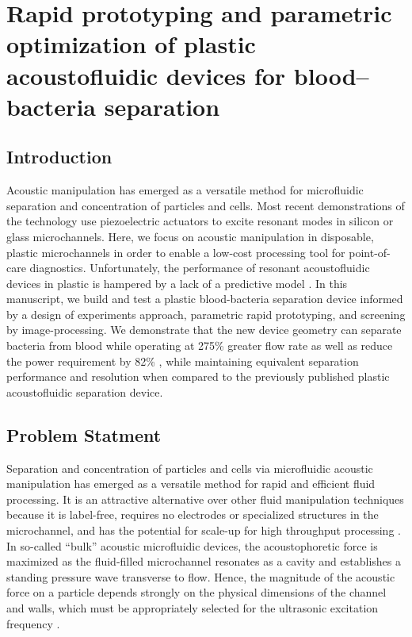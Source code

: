 \chapter{Rapid prototyping and parametric optimization of plastic acoustofluidic devices for blood--bacteria separation}
\label{chapter:acoust}
\thispagestyle{myheadings}

\graphicspath{{4_acoust/Figures/}}

\section{Introduction}
\label{sec:acoust_intro}
Acoustic manipulation has emerged as a versatile method for microfluidic separation and concentration of particles and cells. Most recent demonstrations of the technology use piezoelectric actuators to excite resonant modes in silicon or glass microchannels. Here, we focus on acoustic manipulation in disposable, plastic microchannels in order to enable a low-cost processing tool for point-of-care diagnostics. Unfortunately, the performance of resonant acoustofluidic devices in plastic is hampered by a lack of a predictive model . In this manuscript, we build and test a plastic blood-bacteria separation device informed by a design of experiments approach, parametric rapid prototyping, and screening by image-processing. We demonstrate that the new device geometry can separate bacteria from blood while operating at 275\% greater flow rate as well as reduce the power requirement by 82\% , while maintaining equivalent separation performance and resolution when compared to the previously published plastic acoustofluidic separation device. 

\section{Problem Statment}
\label{sec:acoust_ps}
Separation and concentration of particles and cells via microfluidic acoustic manipulation has emerged as a versatile method for rapid and efficient fluid processing. It is an attractive alternative over other fluid manipulation techniques because it is label-free, requires no electrodes or specialized structures in the microchannel, and has the potential for scale-up for high throughput processing \cite{antfolk2017continuous}\cite{bhagat2010microfluidics}. In so-called ``bulk'' acoustic microfluidic devices, the acoustophoretic force is maximized  as the fluid-filled microchannel resonates as a cavity and establishes a standing pressure wave transverse to flow.  Hence, the magnitude of the acoustic force on a particle depends strongly on the physical dimensions of the channel and walls, which must be appropriately selected for the ultrasonic excitation frequency \cite{bruus2012acoustofluidics}. 

